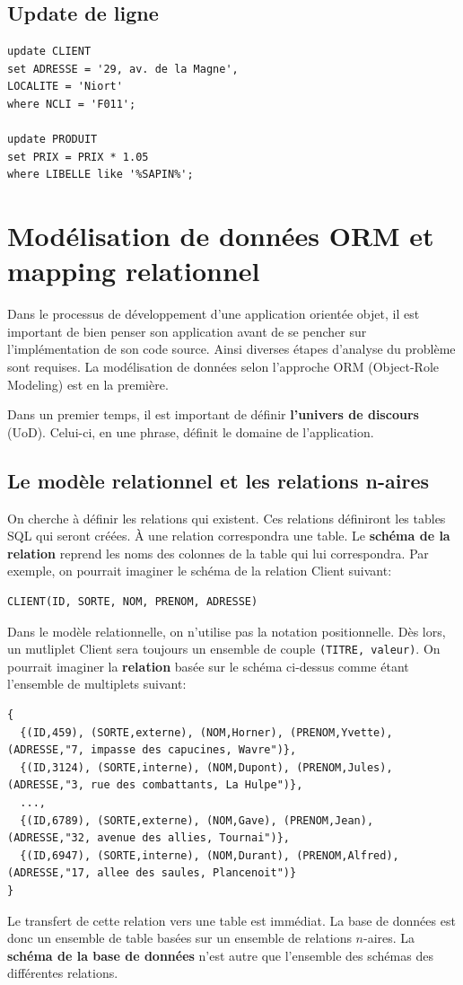 \subsection{Update de ligne}
\begin{lstlisting}
update CLIENT
set ADRESSE = '29, av. de la Magne',
LOCALITE = 'Niort'
where NCLI = 'F011';

update PRODUIT
set PRIX = PRIX * 1.05
where LIBELLE like '%SAPIN%';
\end{lstlisting}

\section{Modélisation de données ORM et mapping relationnel}
Dans le processus de développement d'une application orientée objet,
il est important de bien penser son application avant de se
pencher sur l'implémentation de son code source.
Ainsi diverses étapes d'analyse du problème sont requises.
La modélisation de données selon l'approche
ORM (Object-Role Modeling) est en la première.

Dans un premier temps,
il est important de définir \textbf{l'univers de discours} (UoD).
Celui-ci, en une phrase, définit le domaine de l'application.

\subsection{Le modèle relationnel et les relations n-aires}
On cherche à définir les relations qui existent.
Ces relations définiront les tables SQL qui seront créées.
À une relation correspondra une table.
Le \textbf{schéma de la relation} reprend les noms des colonnes de
la table qui lui correspondra.
Par exemple, on pourrait imaginer le schéma de la relation Client suivant:
\begin{lstlisting}
CLIENT(ID, SORTE, NOM, PRENOM, ADRESSE)
\end{lstlisting}
Dans le modèle relationnelle, on n'utilise pas la notation positionnelle.
Dès lors, un mutliplet Client sera toujours
un ensemble de couple \lstinline$(TITRE, valeur)$.
On pourrait imaginer la \textbf{relation} basée sur
le schéma ci-dessus comme étant l'ensemble de multiplets suivant:
\begin{lstlisting}
{
  {(ID,459), (SORTE,externe), (NOM,Horner), (PRENOM,Yvette), (ADRESSE,"7, impasse des capucines, Wavre")},
  {(ID,3124), (SORTE,interne), (NOM,Dupont), (PRENOM,Jules), (ADRESSE,"3, rue des combattants, La Hulpe")},
  ...,
  {(ID,6789), (SORTE,externe), (NOM,Gave), (PRENOM,Jean), (ADRESSE,"32, avenue des allies, Tournai")},
  {(ID,6947), (SORTE,interne), (NOM,Durant), (PRENOM,Alfred), (ADRESSE,"17, allee des saules, Plancenoit")}
}
\end{lstlisting}
Le transfert de cette relation vers une table est immédiat.
La base de données est donc un ensemble de table basées
sur un ensemble de relations $n$-aires.
La \textbf{schéma de la base de données} n'est
autre que l'ensemble des schémas des différentes relations.

